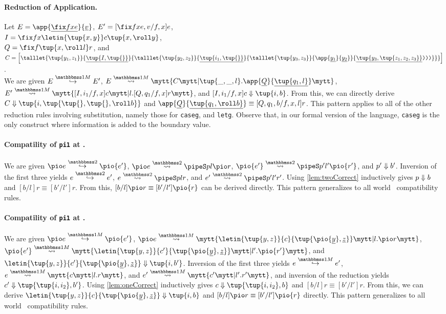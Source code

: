 \begin{abstrsyn}
\paragraph{Reduction of Application.} Let $E = \app {\exv{\fix f x e}} {\exv v}$,
$E' = [\fix fxe, v/f,x] e$, \\ 
$I = \fix f x {\letin {\tup{x,y}} c {\tup{x,\roll y}}}$, \\
$Q = \fix f {\tup{x,\roll l}} r$, and \\
$C = \left[
\talllet{\tup{y_1,z_1}}{\exv {\tup {I,\tup{}}}}{
\talllet{\tup{y_2,z_2}} {\exv {\tup {i_1,\tup{}}}}{
\talllet{\tup{y_3,z_3}}{\app{\exv {y_1}}{\exv {y_2}}}{\exv{\tup{y_3,\tup{z_1,z_2,z_3}}}\ttrpar\ttrpar\ttrpar}}}\right]$.
\\
We are given $\stepmix E {E'}$,
$\splitone E A C {\tup{\_,\_,l}.\app{\exv Q}{\exv{\tup{q_1,l}}}}$,
$\splitone {E'} A {[I,i_1/f,x]c} {l.[Q,q_1/f,x]r}$,
and $\reduce {[I,i_1/f,x]c} {\tup{i,b}}$.
From this, we can directly derive $\reduce C {\tup{i,\tup {\tup{},\tup{},\roll b}}}$
and $\app{\exv Q}{\exv{\tup{q_1,\roll b}}} \equiv [Q,q_1,b/f,x,l] r$.
This pattern applies to all of the other reduction rules involving substitution,
namely those for {\tt caseg}, and {\tt letg}. 
Observe that, in our formal version of the language, 
{\tt caseg} is the only construct where information is added to the boundary value.

\paragraph{Compatility of {\tt pi1} at \bbtwo.}
We are given 
$\steptwo {\pio e} {\pio {e'}}$, 
$\splittwo {\pio e} A p l {\pio r}$, 
$\splittwo {\pio {e'}} A {p'} {l'} {\pio {r'}}$,
and ${p'} \Downarrow {b'}$.
Inversion of the first three yields
$\steptwo e {e'}$, $\splittwo e A p l r$, and $\splittwo {e'} A {p'} {l'} {r'}$.
Using \ref{lem:twoCorrect} inductively gives ${p} \Downarrow {b}$ and $[b/l]r \equiv [b'/l']r$.
From this, $[b/l]\pio r \equiv [b'/l']\pio {r}$ can be derived directly.
This pattern generalizes to all world \bbtwo\ compatibility rules.

\paragraph{Compatility of {\tt pi1} at \bbonem.}
We are given
$\stepmix {\pio e} {\pio {e'}}$, 
$\splitone {\pio e} A {\letin{\tup{y,z}}{c}{\tup{\pio {\exv y},\exv z}}} {l.\pio r}$, \\
\mbox{$\splitone {\pio {e'}} A {\letin{\tup{y,z}}{c'}{\tup{\pio {\exv y},\exv z}}} {l'.\pio {r'}}$},
and \\ $\reduce {\letin{\tup{y,z}}{c'}{\tup{\pio {\exv y},\exv z}}} {\tup{i,b'}}$.
Inversion of the first three yields 
$\stepmix e {e'}$, $\splitone e A c {l.r}$, and $\splitone {e'} A {c'} {l'.r'}$, 
and inversion of the reduction yields $\reduce {c'} {\tup{\tup{i,i_2},b'}}$.
Using \ref{lem:oneCorrect} inductively gives $\reduce c {\tup{\tup{i,i_2},b}}$ and $[b/l]r \equiv [b'/l']r$.
From this, we can derive $\reduce {\letin{\tup{y,z}}{c}{\tup{\pio {\exv y},\exv z}}} {\tup{i,b}}$ and 
$[b/l]\pio r \equiv [b'/l']\pio {r}$ directly.
This pattern generalizes to all world \bbonem\ compatibility rules.


\end{abstrsyn}
